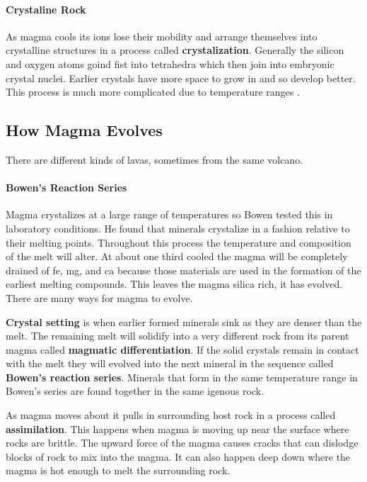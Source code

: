 \documentclass{article}
\begin{document}
\paragraph{Crystaline Rock} %
\label{par:crystaline_rock}
As magma cools its ions lose their mobility and arrange themselves into crystalline structures in a process called \textbf{crystalization}. Generally the silicon and oxygen atoms goind fist into tetrahedra which then join into embryonic crystal nuclei. Earlier crystals have more space to grow in and so develop better. This process is much more complicated due to temperature ranges .

\subsection*{How Magma Evolves} %
\label{sub:how_magma_evolves}
There are different kinds of lavas, sometimes from the same volcano.

\paragraph{Bowen's Reaction Series} %
\label{par:bowen_s_reaction_series}
Magma crystalizes at a large range of temperatures so Bowen tested this in laboratory conditions. He found that minerals crystalize in a fashion relative to their melting points. Throughout this process the temperature and composition of the melt will alter. At about one third cooled the magma will be completely drained of fe, mg, and ca because those materials are used in the formation of the earliest melting compounds. This leaves the magma silica rich, it has evolved. There are many ways for magma to evolve.

\textbf{Crystal setting} is when earlier formed minerals sink as they are denser than the melt. The remaining melt will solidify into a very different rock from its parent magma called \textbf{magmatic differentiation}. If the solid crystals remain in contact with the melt they will evolved into the next mineral in the sequence called \textbf{Bowen's reaction series}. Minerals that form in the same temperature range in Bowen's series  are found together in the same igenous rock.

As magma moves about it pulls in surrounding host rock in a process called \textbf{assimilation}. This happens when magma is moving up near the surface where rocks are brittle. The upward force of the magma causes cracks that can dislodge blocks of rock to mix into the magma. It can also happen deep down where the magma is hot enough to melt the surrounding rock.
\end{document}
